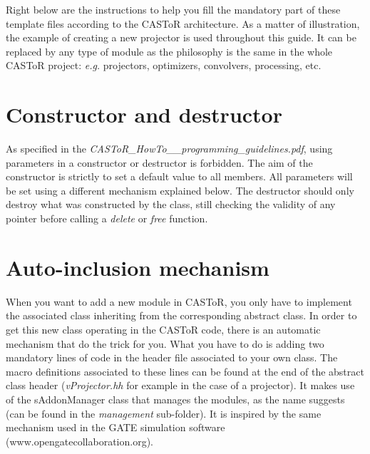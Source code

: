 \documentclass[a4paper, 11pt]{article}
\begin{document}
Right below are the instructions to help you fill the mandatory part of these template files according to the CASToR architecture.
As a matter of illustration, the example of creating a new projector is used throughout this guide.
It can be replaced by any type of module as the philosophy is the same in the whole CASToR project: \textit{e.g.} projectors, optimizers, convolvers, processing, etc.

\section{Constructor and destructor}

As specified in the \textit{CASToR\_HowTo\_\_programming\_guidelines.pdf}, using parameters in a constructor or destructor is forbidden.
The aim of the constructor is strictly to set a default value to all members.
All parameters will be set using a different mechanism explained below.
The destructor should only destroy what was constructed by the class, still checking the validity of any pointer before calling a \textit{delete} or \textit{free} function.

\section{Auto-inclusion mechanism}

When you want to add a new module in CASToR, you only have to implement the associated class inheriting from the corresponding abstract class.
In order to get this new class operating in the CASToR code, there is an automatic mechanism that do the trick for you.
What you have to do is adding two mandatory lines of code in the header file associated to your own class.
The macro definitions associated to these lines can be found at the end of the abstract class header (\textit{vProjector.hh} for example in the case of a projector).
It makes use of the sAddonManager class that manages the modules, as the name suggests (can be found in the \textit{management} sub-folder).
It is inspired by the same mechanism used in the GATE simulation software (www.opengatecollaboration.org).\\
\end{document}

